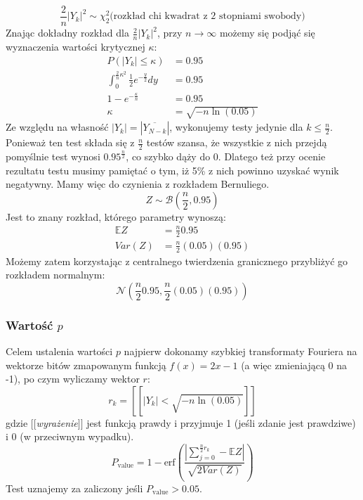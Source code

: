 \begin{equation}
    \frac{2}{n}|Y_k|^2 \sim \chi^2_2 \textrm{(rozkład chi kwadrat z 2 stopniami swobody)}
\end{equation}
Znając dokładny rozkład dla $\frac{2}{n}|Y_k|^2$, przy $n \to \infty$ możemy się podjąć się wyznaczenia wartości krytycznej $\kappa$:
\begin{equation}
    \begin{split}
        P(|Y_k| \leq \kappa) &= 0.95\\
        \int_0^{\frac{2}{n}\kappa^2}\frac{1}{2}e^{-\frac{y}{2}}dy &= 0.95\\
        1 - e^{-\frac{\kappa}{n}} &= 0.95\\
        \kappa &= \sqrt{-n\ln{(0.05)}}
    \end{split}
\end{equation}
Ze względu na własność $|Y_k| = |\overline{Y_{N-k}}|$, wykonujemy testy jedynie dla $k \leq \frac{n}{2}$. Ponieważ ten test składa się z $\frac{n}{2}$ testów szansa, że wszystkie z nich przejdą pomyślnie test wynosi $0.95^{\frac{n}{2}}$, co szybko dąży do 0. Dlatego też przy ocenie rezultatu testu musimy pamiętać o tym, iż 5\% z nich powinno uzyskać wynik negatywny. Mamy więc do czynienia z rozkładem Bernuliego.
\begin{equation}
    Z \sim \mathcal{B}(\frac{n}{2}, 0.95)
\end{equation}
Jest to znany rozkład, którego parametry wynoszą:
\begin{equation}
    \begin{split}
        \mathbb{E}Z &= \frac{n}{2}0.95\\
        Var(Z) &= \frac{n}{2}(0.05)(0.95)
    \end{split}
\end{equation}
Możemy zatem korzystając z centralnego twierdzenia granicznego przybliżyć go rozkładem normalnym:
\begin{equation}
    \mathcal{N}\left(\frac{n}{2}0.95, \frac{n}{2}(0.05)(0.95)\right)
\end{equation}
\subsubsection{Wartość $p$}
Celem ustalenia wartości $p$ najpierw dokonamy szybkiej transformaty Fouriera na wektorze bitów zmapowanym funkcją $f(x) = 2x - 1$ (a więc zmieniającą 0 na -1), po czym wyliczamy wektor $r$:
\begin{equation}
    r_k =[\![|Y_k| < \sqrt{-n\ln{(0.05)}}]\!]
\end{equation}
gdzie $[\![$\emph{wyrażenie}$]\!]$ jest funkcją prawdy i przyjmuje 1 (jeśli zdanie jest prawdziwe) i 0 (w przeciwnym wypadku).
\begin{equation}
    P_{\textrm{value}} = 1 - \textrm{erf}\left(\frac{|\sum_{j=0}^{\frac{n}{2}r_k} - \mathbb{E}Z|}{\sqrt{2Var(Z)}} \right)
\end{equation}
Test uznajemy za zaliczony jeśli $P_{\textrm{value}} > 0.05$.

